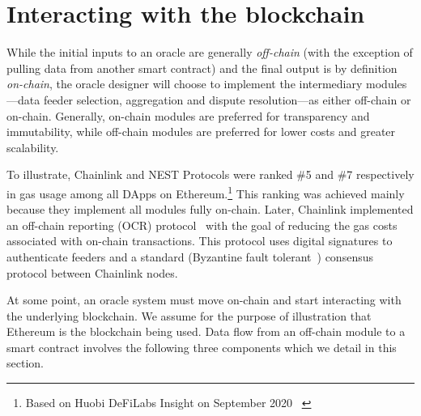 
\section{Interacting with the blockchain}\label{Interoperability}

While the initial inputs to an oracle are generally \textit{off-chain} (with the exception of pulling data from another smart contract) and the final output is by definition \textit{on-chain}, the oracle designer will choose to implement the intermediary modules---data feeder selection, aggregation and dispute resolution---as either off-chain or on-chain. Generally, on-chain modules are preferred for transparency and immutability, while off-chain modules are preferred for lower costs and greater scalability. 

To illustrate, Chainlink and NEST Protocols were ranked \#5 and \#7 respectively in gas usage among all DApps on Ethereum.\footnote{Based on Huobi DeFiLabs Insight on September 2020 ~\cite{huobiDeFiLabs}} This ranking was achieved mainly because they implement all modules fully on-chain. Later, Chainlink implemented an off-chain reporting (OCR) protocol~\cite{chainlinkocr} with the goal of reducing the gas costs associated with on-chain transactions. This protocol uses digital signatures to authenticate feeders and a standard (\eg Byzantine fault tolerant~\cite{castro2002practical}) consensus protocol between Chainlink nodes.

At some point, an oracle system must move on-chain and start interacting with the underlying blockchain. We assume for the purpose of illustration that Ethereum is the blockchain being used. Data flow from an off-chain module to a smart contract involves the following three components which we detail in this section. 

